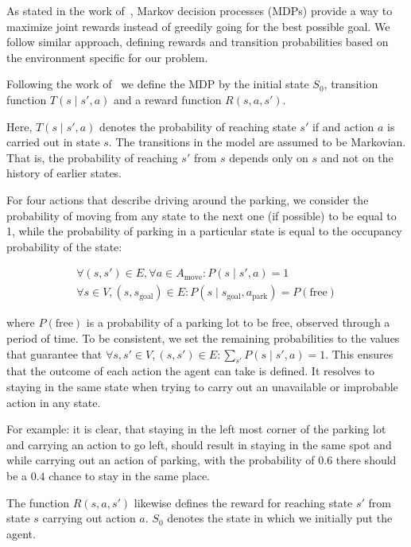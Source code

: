 As stated in the work of~\citet{tipaldiICRA11}, Markov decision processes
(MDPs) provide a way to maximize joint rewards instead of greedily going for
the best possible goal. We follow similar approach, defining rewards and
transition probabilities based on the environment specific for our problem.

Following the work of~\citet{bellman1957} we define the MDP by the initial
state $S_0$, transition function $T(s \mid s', a)$ and a reward function $R(s,
a, s')$.

Here, $T(s \mid s', a)$ denotes the probability of reaching state
$s'$ if and action $a$ is carried out in state $s$. The transitions in the
model are assumed to be Markovian. That is, the probability of reaching $s'$
from $s$ depends only on $s$ and not on the history of earlier states.

For four actions that describe driving around the parking, we consider the
probability of moving from any state to the next one (if possible) to be equal
to 1, while the probability of parking in a particular state is equal to the
occupancy probability of the state:

\begin{eqnarray}
\forall (s, s') \in E, \forall a \in A_{\mbox{move}} : P(s \mid s', a) = 1 \\
\forall s \in V, (s,s_{\mbox{goal}}) \in E : P(s \mid s_{\mbox{goal}}, a_{\mbox{park}}) = P(\mbox{free})
\end{eqnarray}

where $P(\mbox{free})$ is a probability of a parking lot to be free, observed
through a period of time. To be consistent, we set the remaining probabilities
to the values that guarantee that $\forall s, s' \in V, (s, s') \in E :
\sum_{s'}P(s \mid s', a) = 1$. This ensures that the outcome of each action
the agent can take is defined. It resolves to staying in the same state when
trying to carry out an unavailable or improbable action in any state.

For example: it is clear, that staying in the left most corner of the parking
lot and carrying an action to go left, should result in staying in the same
spot and while carrying out an action of parking, with the probability of
$0.6$ there should be a $0.4$ chance to stay in the same place.

The function $R(s, a, s')$ likewise defines the reward for reaching state $s'$
from state $s$ carrying out action $a$. $S_0$ denotes the state in which we
initially put the agent.

